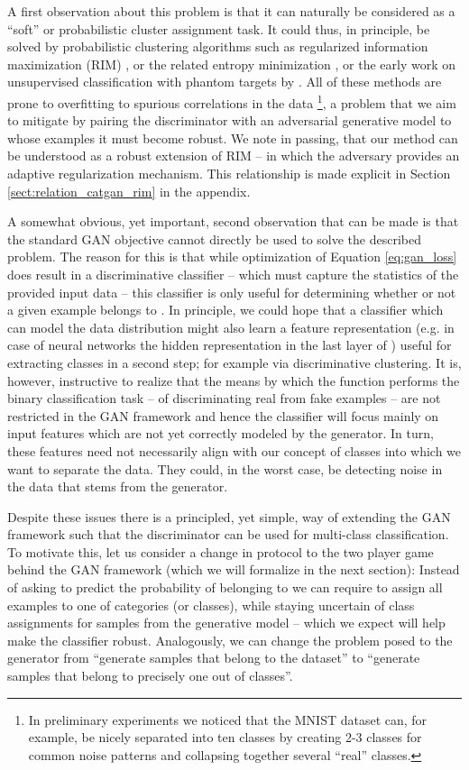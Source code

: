 \documentclass{article} \usepackage{iclr2016_conference,times}
\begin{document}
A first observation about this problem is that it can naturally be
considered as a ``soft'' or probabilistic cluster assignment task. It
could thus, in principle, be solved by probabilistic clustering
algorithms such as regularized information maximization (RIM)
\citep{Krause_2010}, or the related entropy minimization
\citep{Grandvalet_2004}, or the early work on unsupervised
classification with phantom targets by \citet{Bridle_91}. All of these
methods are prone to overfitting to spurious correlations in the data
\footnote{In preliminary experiments we noticed that the MNIST dataset
  can, for example, be nicely separated into ten classes by creating
  2-3 classes for common noise patterns and collapsing together
  several ``real'' classes.}, a problem that we aim to mitigate by
pairing the discriminator with an adversarial generative model to
whose examples it must become robust. We note in passing, that our
method can be understood as a robust extension of RIM -- in which the
adversary provides an adaptive regularization mechanism. This
relationship is made explicit in Section
\ref{sect:relation_catgan_rim} in the appendix.

A somewhat obvious, yet important, second observation that can be made
is that the standard GAN objective cannot directly be used to solve
the described problem.  The reason for this is that while optimization
of Equation \eqref{eq:gan_loss} does result in a discriminative
classifier  -- which must capture the statistics of the provided
input data -- this classifier is only useful for determining whether
or not a given example  belongs to . In principle, we
could hope that a classifier which can model the data distribution
might also learn a feature representation (e.g. in case of neural
networks the hidden representation in the last layer of ) useful
for extracting classes in a second step; for example via
discriminative clustering.  It is, however, instructive to realize
that the means by which the function  performs the binary
classification task -- of discriminating real from fake examples --
are not restricted in the GAN framework and hence the classifier will
focus mainly on input features which are not yet correctly modeled by
the generator. In turn, these features need not necessarily align with
our concept of classes into which we want to separate the data. They
could, in the worst case, be detecting noise in the data that stems
from the generator.

Despite these issues there is a principled, yet simple, way of
extending the GAN framework such that the discriminator can be used
for multi-class classification. To motivate this, let us consider
a change in protocol to the two player game behind the GAN framework (which
we will formalize in the next section): 
Instead of asking  to predict the probability of  belonging to
 we can require  to assign all examples to one of 
categories (or classes), while staying uncertain of class assignments for
samples from the generative model  -- which we expect will help make
the classifier robust. 
Analogously, we can change the problem posed to the generator from
``generate samples that belong to the dataset'' to ``generate samples
that belong to precisely one out of  classes''.
\end{document}
